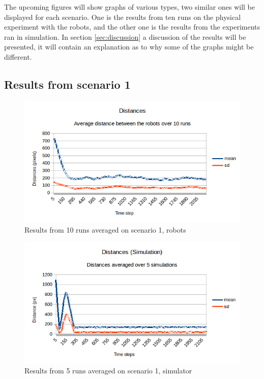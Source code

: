 The upcoming figures will show graphs of various types, two similar ones will be displayed for each scenario. One is the results from ten runs on the physical experiment with the robots, and the other one is the results from the experiments ran in simulation. In section \ref{sec:discussion} a discussion of the results will be presented, it will contain an explanation as to why some of the graphs might be different.

\subsection{Results from scenario 1}
\label{sec:res1}
\begin{figure}[h]
\begin{center}
\includegraphics[width=0.8\linewidth]{figs/runs/1pdist}
\end{center}
\caption[1. Distances, robots]{Results from 10 runs averaged on scenario 1, robots}
\label{fig:res1pdist}
\end{figure}
\begin{figure}[h]
\begin{center}
\includegraphics[width=0.8\linewidth]{figs/runs/1sdist}
\end{center}
\caption[1. Distances, simulation]{Results from 5 runs averaged on scenario 1, simulator}
\label{fig:res1sdist}
\end{figure}
